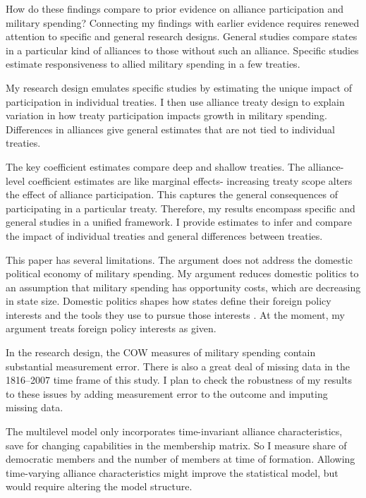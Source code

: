 \documentclass[12pt]{article}
\begin{document}
How do these findings compare to prior evidence on alliance participation and military spending? 
Connecting my findings with earlier evidence requires renewed attention to specific and general research designs. 
General studies compare states in a particular kind of alliances to those without such an alliance. 
Specific studies estimate responsiveness to allied military spending in a few treaties. 


My research design emulates specific studies by estimating the unique impact of participation in individual treaties. 
I then use alliance treaty design to explain variation in how treaty participation impacts growth in military spending.
Differences in alliances give general estimates that are not tied to individual treaties.  


The key coefficient estimates compare deep and shallow treaties. 
The alliance-level coefficient estimates are like marginal effects- increasing treaty scope alters the effect of alliance participation.
This captures the general consequences of participating in a particular treaty. 
Therefore, my results encompass specific and general studies in a unified framework. 
I provide estimates to infer and compare the impact of individual treaties and general differences between treaties. 


This paper has several limitations.
The argument does not address the domestic political economy of military spending. 
My argument reduces domestic politics to an assumption that military spending has opportunity costs, which are decreasing in state size. 
Domestic politics shapes how states define their foreign policy interests and the tools they use to pursue those interests \citep{Fordham1998, Fordham2011, Narizny2007}.
At the moment, my argument treats foreign policy interests as given.  


In the research design, the COW measures of military spending contain substantial measurement error. 
There is also a great deal of missing data in the 1816--2007 time frame of this study. 
I plan to check the robustness of my results to these issues by adding measurement error to the outcome and imputing missing data.


The multilevel model only incorporates time-invariant alliance characteristics, save for changing capabilities in the membership matrix. 
So I measure share of democratic members and the number of members at time of formation. 
Allowing time-varying alliance characteristics might improve the statistical model, but would require altering the model structure. 
\end{document}
